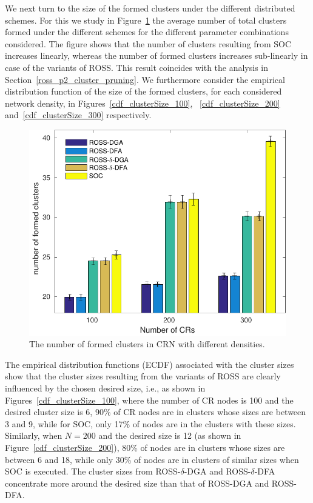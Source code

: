\documentclass[times]{ettauth}
\newcommand{\ie}{i.e., }
\theoremstyle{mytheoremstyle}
\theoremstyle{mytheoremstyle}
\theoremstyle{mytheoremstyle}
\begin{document}
We next turn to the size of the formed clusters under the different distributed schemes.
For this we study in Figure~\ref{nClusters_largeNetwork} the average number of total clusters formed under the different schemes for the different parameter combinations considered.
The figure shows that the number of clusters resulting from SOC increases linearly, whereas the number of formed clusters increases sub-linearly in case of the variants of ROSS.
This result coincides with the analysis in Section~\ref{ross_p2_cluster_pruning}.
We furthermore consider the empirical distribution function of the size of the formed clusters, for each considered network density, in Figures~\ref{cdf_clusterSize_100}, ~\ref{cdf_clusterSize_200} and~\ref{cdf_clusterSize_300} respectively.
\begin{figure}[!h]
  \centering
   \includegraphics[width=0.7\linewidth]{nClusters_largeNetwork_no_texture.pdf}
  \caption{The number of formed clusters in CRN with different densities.}
  \label{nClusters_largeNetwork}
\end{figure}

The empirical distribution functions (ECDF) associated with the cluster sizes show that the cluster sizes resulting from the variants of ROSS are clearly influenced by the chosen desired size, \ie as shown in Figures~\ref{cdf_clusterSize_100}, where the number of CR nodes is 100 and the desired cluster size is 6, 90\% of CR nodes are in clusters whose sizes are between 3 and 9, while for SOC, only 17\% of nodes are in the clusters with these sizes.
Similarly, when $N=200$ and the desired size is 12 (as shown in Figure~\ref{cdf_clusterSize_200}), 80\% of nodes are in clusters whose sizes are between 6 and 18, while only 30\% of nodes are in clusters of similar sizes when SOC is executed.
The cluster sizes from ROSS-$\delta$-DGA and ROSS-$\delta$-DFA concentrate more around the desired size than that of ROSS-DGA and ROSS-DFA.
\end{document}
